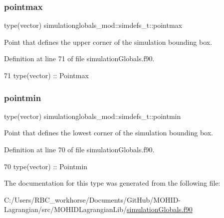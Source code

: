 \subsubsection{\texorpdfstring{pointmax}{pointmax}}
{\footnotesize\ttfamily type(vector) simulationglobals\+\_\+mod\+::simdefs\+\_\+t\+::pointmax\hspace{0.3cm}{\ttfamily [private]}}



Point that defines the upper corner of the simulation bounding box. 



Definition at line 71 of file simulation\+Globals.\+f90.


\begin{DoxyCode}
71         \textcolor{keywordtype}{type}(vector)    ::  Pointmax
\end{DoxyCode}
\mbox{\label{structsimulationglobals__mod_1_1simdefs__t_ac4fc53f104e7620ef7f0384382dcc1a2}} 
\subsubsection{\texorpdfstring{pointmin}{pointmin}}
{\footnotesize\ttfamily type(vector) simulationglobals\+\_\+mod\+::simdefs\+\_\+t\+::pointmin\hspace{0.3cm}{\ttfamily [private]}}



Point that defines the lowest corner of the simulation bounding box. 



Definition at line 70 of file simulation\+Globals.\+f90.


\begin{DoxyCode}
70         \textcolor{keywordtype}{type}(vector)    ::  Pointmin
\end{DoxyCode}


The documentation for this type was generated from the following file\+:\begin{DoxyCompactItemize}
\item 
C\+:/\+Users/\+R\+B\+C\+\_\+workhorse/\+Documents/\+Git\+Hub/\+M\+O\+H\+I\+D-\/\+Lagrangian/src/\+M\+O\+H\+I\+D\+Lagrangian\+Lib/\mbox{\hyperlink{simulation_globals_8f90}{simulation\+Globals.\+f90}}\end{DoxyCompactItemize}
